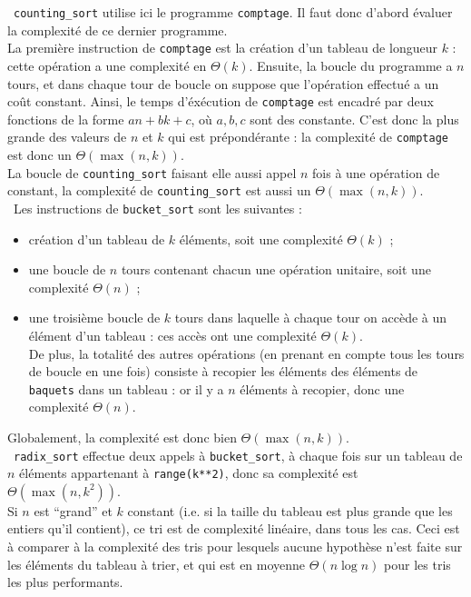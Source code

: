 \question\ \verb|counting_sort| utilise ici le programme \verb|comptage|. Il faut 
donc d'abord évaluer la complexité de ce dernier programme.\\
La première instruction de \verb|comptage| est la création d'un tableau de 
longueur $k$ : cette opération a une complexité en $\Theta(k)$. Ensuite, la 
boucle du programme a $n$ tours, et dans chaque tour de boucle on suppose que 
l'opération effectué a un coût constant. Ainsi, le temps d'éxécution de 
\verb|comptage| est encadré par deux fonctions de la forme $an+bk+c$, où 
$a,b,c$ sont des constante. C'est donc la plus grande des valeurs de $n$ et $k$ 
qui est prépondérante : la complexité de \verb|comptage| est donc un 
$\Theta(\max(n,k))$.\\
La boucle de \verb|counting_sort| faisant elle aussi appel $n$ fois à une 
opération de constant, la complexité de \verb|counting_sort| est aussi un 
$\Theta(\max(n,k))$.\\

\question\ Les instructions de \verb|bucket_sort| sont les suivantes :
\begin{itemize}
\item création d'un tableau de $k$ éléments, soit une complexité $\Theta(k)$ ;
\item une boucle de $n$ tours contenant chacun une opération unitaire, soit 
une complexité $\Theta(n)$ ;
\item une troisième boucle de $k$ tours dans laquelle à chaque tour on accède à 
un élément d'un tableau : ces accès ont une complexité $\Theta(k)$.\\
De plus,  la totalité des autres
opérations (en prenant en compte tous les tours de boucle en une fois) consiste 
à recopier les éléments des éléments de \verb|baquets| dans un tableau : or il y 
a $n$ éléments à recopier, donc une complexité $\Theta(n)$.
\end{itemize}
Globalement, la complexité est donc bien $\Theta(\max(n,k))$.\\

\question\ \verb|radix_sort| effectue deux appels à \verb|bucket_sort|, à chaque 
fois sur un tableau de $n$ éléments appartenant à \verb|range(k**2)|, donc sa 
complexité est $\Theta(\max(n,k^2))$.\\
Si $n$ est ``grand'' et $k$ constant (i.e. si la taille du tableau est plus 
grande que les entiers qu'il contient), ce tri est de complexité linéaire, dans 
tous les cas. Ceci est à comparer à la complexité des tris pour lesquels aucune 
hypothèse n'est faite sur les éléments du tableau à trier, et qui est en 
moyenne $\Theta(n\log n)$ pour les tris les plus performants.\\

